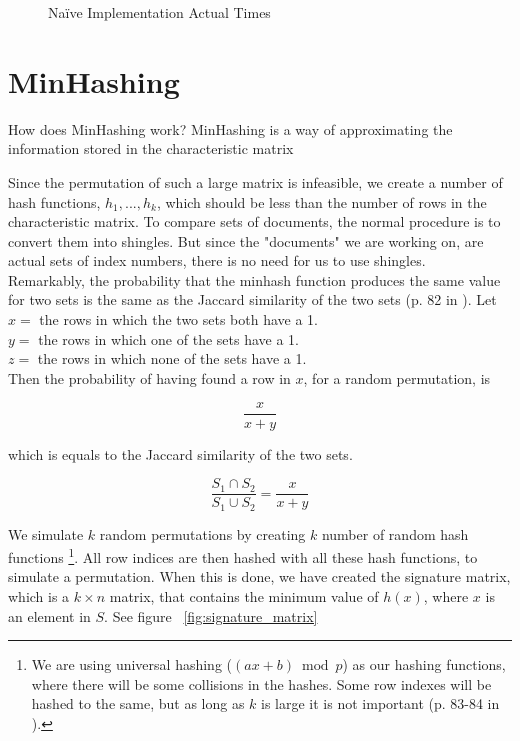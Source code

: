 \documentclass[a4paper,11pt]{article}
\begin{document}
\begin{figure}[!htbp]
    \begin{center}
        
        \caption{Naïve Implementation Actual Times}
        \label{fig:naive_at}
    \end{center}
\end{figure}


\section{MinHashing}\label{sec:minhashing}
How does MinHashing work?
 MinHashing is a way of approximating the information stored in the characteristic matrix

Since the permutation of such a large matrix is infeasible, we create a number of hash functions, $h_1, ..., h_k$, which should be less than the number of rows in the characteristic matrix. To compare sets of documents, the normal procedure is to convert them into shingles. But since the "documents" we are working on, are actual sets of index numbers, there is no need for us to use shingles. \\

Remarkably, the probability that the minhash function produces the same value for two sets is the same as the Jaccard similarity of the two sets (p. 82 in \cite{book:mmds}). Let \\

    $x = $ the rows in which the two sets both have a 1. \\
    $y = $ the rows in which one of the sets have a 1. \\
    $z = $ the rows in which none of the sets have a 1. \\

Then the probability of having found a row in $x$, for a random permutation, is

\begin{equation*}
    \frac{x}{x+y}
\end{equation*}

which is equals to the Jaccard similarity of the two sets.

\begin{equation*}
    \frac{S_1 \cap S_2}{S_1 \cup S_2} = \frac{x}{x+y}
\end{equation*}
    
We simulate $k$ random permutations by creating $k$ number of random hash functions \footnote{We are using universal hashing ($(ax + b) \bmod p$) as our hashing functions, where there will be some collisions in the hashes. Some row indexes will be hashed to the same, but as long as $k$ is large it is not important (p. 83-84 in \cite{book:mmds}).}. All row indices are then hashed with all these hash functions, to simulate a permutation. When this is done, we have created the signature matrix, which is a $k\times n$ matrix, that contains the minimum value of $h(x)$, where $x$ is an element in $S$. See figure ~\ref{fig:signature_matrix}\\
\end{document}
